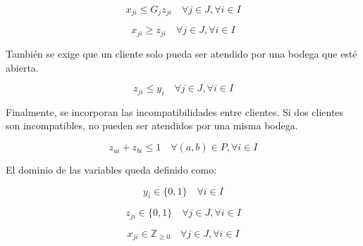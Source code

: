 \begin{equation}
x_{ji} \leq G_j z_{ji} \quad \forall j \in J, \forall i \in I
\end{equation}

\begin{equation}
x_{ji} \geq z_{ji} \quad \forall j \in J, \forall i \in I
\end{equation}

\noindent También se exige que un cliente solo pueda ser atendido por una bodega que esté abierta.

\begin{equation}
z_{ji} \leq y_i \quad \forall j \in J, \forall i \in I
\end{equation}

\noindent Finalmente, se incorporan las incompatibilidades entre clientes. Si dos clientes son incompatibles, no pueden ser atendidos por una misma bodega.

\begin{equation}
z_{ai} + z_{bi} \leq 1 \quad \forall (a,b) \in P, \forall i \in I
\end{equation}

\noindent El dominio de las variables queda definido como:

\begin{equation}
y_i \in \{0,1\} \quad \forall i \in I
\end{equation}

\begin{equation}
z_{ji} \in \{0,1\} \quad \forall j \in J, \forall i \in I
\end{equation}

\begin{equation}
x_{ji} \in \mathbb{Z}_{\geq 0} \quad \forall j \in J, \forall i \in I
\end{equation}
